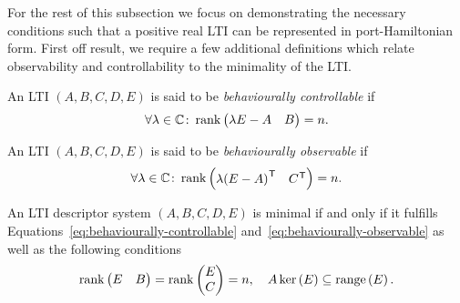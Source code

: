 For the rest of this subsection we focus on demonstrating the necessary conditions such that a positive real \ac{LTI} can be represented in port-Hamiltonian form.
First off result, we require a few additional definitions which relate observability and controllability to the minimality of the \ac{LTI}.

\begin{definition}\label{def:behaviourally-controllable}
    An \ac{LTI} $(A, B, C, D, E)$ is said to be \emph{behaviourally controllable} if
    \begin{equation}\label{eq:behaviourally-controllable}
        \forall \lambda  \in \mathbb{C} \colon \mathop{}\!\mathrm{rank}\left(\begin{matrix}
            \lambda E - A & B
        \end{matrix}\right) = n.
    \end{equation}
\end{definition}

\begin{definition}\label{def:behaviourally-observable}
    An \ac{LTI} $(A, B, C, D, E)$ is said to be \emph{behaviourally observable} if
    \begin{equation}\label{eq:behaviourally-observable}
        \forall \lambda  \in \mathbb{C} \colon \mathop{}\!\mathrm{rank}\left(\begin{matrix}
            \lambda {(E - A)}^{\mkern1mu \mathsf{T}} & C^{\mkern1mu \mathsf{T}}
        \end{matrix}\right) = n.
    \end{equation}
\end{definition}

\begin{lemma}\label{lem:minimality-conditions}
    An \ac{LTI} descriptor system $(A, B, C, D, E)$ is minimal if and only if it fulfills Equations~\eqref{eq:behaviourally-controllable} and~\eqref{eq:behaviourally-observable} as well as the following conditions
    \begin{equation*}
        \mathop{}\!\mathrm{rank}\left(\begin{matrix}
            E & B
        \end{matrix}\right) = \mathop{}\!\mathrm{rank}\left(\begin{matrix}
            E \\
            C
        \end{matrix}\right) = n,\quad A \mathop{}\!\mathrm{ker}\left(E\right) \subseteq \mathop{}\!\mathrm{range}\left(E\right).
    \end{equation*}
\end{lemma}

